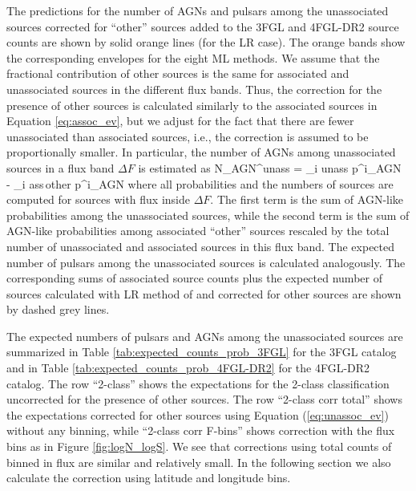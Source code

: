 The predictions for the number of AGNs and pulsars among the unassociated sources corrected for ``other'' sources 
added to the 3FGL and 4FGL-DR2  source counts are shown by solid orange lines (for the LR case).
The orange bands show the corresponding envelopes for the eight ML methods.
We assume that the fractional contribution of other sources is the same for associated and unassociated sources in the different flux bands.
Thus, the correction for the presence of other sources is calculated similarly to the associated sources in Equation \ref{eq:assoc_ev},
but we adjust for the fact that there are fewer unassociated than associated sources, i.e., 
the correction is assumed to be proportionally smaller.
In particular, the number of AGNs among unassociated sources in a flux band $\Delta F$ is estimated as
\be
{}
N_{\rm AGN}^{\rm unass} = \sum_{i \in \rm unass} p^i_{\rm AGN}\,\, - \sum_{i \in \rm ass\,other} p^i_{\rm AGN} \cdot 
{}
\ee
where all probabilities and the numbers of sources are computed for sources with flux inside $\Delta F$.
The first term is the sum of AGN-like probabilities among the unassociated sources,
while the second term is the sum of AGN-like probabilities among associated ``other'' sources rescaled by the total number
of unassociated and associated sources in this flux band.
The expected number of pulsars among the unassociated sources is calculated analogously.
The corresponding sums of associated source counts plus the expected number of sources calculated with LR method of \cite{2016ApJ...820....8S} 
and corrected for other sources are shown by dashed grey lines.


The expected numbers of pulsars and AGNs among the unassociated sources
are summarized in Table \ref{tab:expected_counts_prob_3FGL} for the 3FGL catalog and 
in Table \ref{tab:expected_counts_prob_4FGL-DR2} for the 4FGL-DR2 catalog.
The row ``2-class'' shows the expectations for the 2-class classification uncorrected for the presence of other sources.
The row ``2-class corr total'' shows the expectations corrected for other sources using Equation (\ref{eq:unassoc_ev}) without any binning,
while ``2-class corr F-bins'' shows correction with the flux bins as in Figure \ref{fig:logN_logS}.
We see that corrections using total counts of binned in flux are similar and relatively small.
In the following section we also calculate the correction using latitude and longitude bins.

